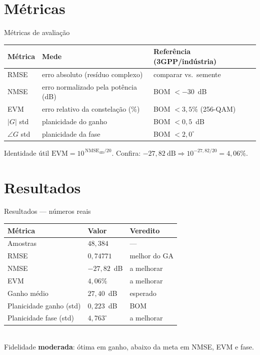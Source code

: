 \documentclass[10pt,aspectratio=169]{beamer}
\begin{document}
\section{Métricas}
\begin{frame}{Métricas de avaliação}
  \scriptsize
  \begin{tabular}{@{}lll@{}}
    \toprule
    Métrica & Mede & Referência (3GPP/indústria)\\
    \midrule
    RMSE & erro absoluto (resíduo complexo) & comparar vs.\ semente\\
    NMSE & erro normalizado pela potência (dB) & BOM $<-30$~dB \\
    EVM & erro relativo da constelação (\%) & BOM $<3{,}5\%$ (256-QAM)\\
    $|G|$ std & planicidade do ganho & BOM $<0{,}5$~dB\\
    $\angle G$ std & planicidade da fase & BOM $<2{,}0^\circ$\\
    \bottomrule
  \end{tabular}
  \vspace{0.4cm}
  \normalsize
  \begin{block}{\footnotesize Identidade útil}
    \footnotesize $\text{EVM}=10^{\,\text{NMSE}_{\text{dB}}/20}$.\quad
    Confira: $-27{,}82~\text{dB}\Rightarrow 10^{-27{,}82/20}=4{,}06\%$.
  \end{block}
\end{frame}

\section{Resultados}
\begin{frame}{Resultados --- números reais}
  \footnotesize
  \begin{tabular}{@{}lll@{}}
    \toprule
    Métrica & Valor & Veredito\\
    \midrule
    Amostras & $48{,}384$ & ---\\
    RMSE & $0{,}74771$ & melhor do GA\\
    NMSE & $-27{,}82$~dB & \textcolor{corange}{a melhorar}\\
    EVM & $4{,}06\%$ & \textcolor{corange}{a melhorar}\\
    Ganho médio & $27{,}40$~dB & \textcolor{cgreen}{esperado}\\
    Planicidade ganho (std) & $0{,}223$~dB & \textcolor{cgreen}{BOM}\\
    Planicidade fase (std) & $4{,}763^\circ$ & \textcolor{corange}{a melhorar}\\
    \bottomrule
  \end{tabular}
  \vspace{0.3cm}\\
  \footnotesize Fidelidade \textbf{moderada}: ótima em ganho, abaixo da meta em NMSE, EVM e fase.
\end{frame}
\end{document}
